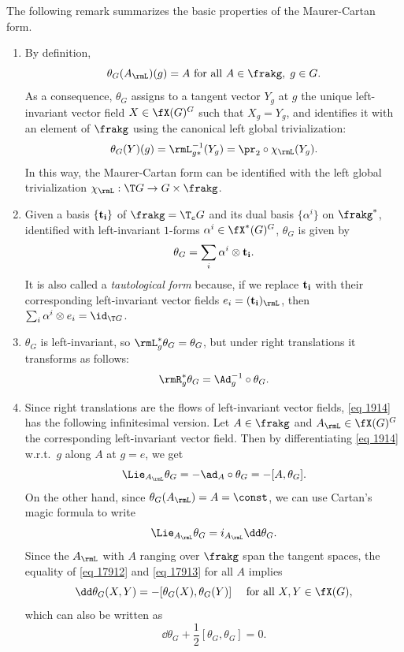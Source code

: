 The following remark summarizes the basic properties of the Maurer-Cartan form.

\begin{rem}
    \begin{enumerate}
        \item By definition,
        \[\theta_G(A_\rmL)(g)=A\text{ for all }A\in\frakg,\; g\in G.\]
        As a consequence, $\theta_G$ assigns to a tangent vector $Y_g$ at $g$ the unique left-invariant vector field $X\in\fX(G)^G$ such that $X_g=Y_g$, and identifies it with an element of $\frakg$ using the canonical left global trivialization:
        \[\theta_G(Y)(g)=\rmL_{g\ast}^{-1}(Y_g)=\pr_2\circ \chi_\rmL(Y_g).\]
        In this way, the Maurer-Cartan form can be identified with the left global trivialization $\chi_\rmL:\T G\to G\times\frakg$.
        \item Given a basis $\{\bf{t}_i\}$ of $\frakg=\T_eG$ and its dual basis $\{\alpha^i\}$ on $\frakg^\ast$, identified with left-invariant $1$-forms $\alpha^i\in\fX^\ast(G)^G$, $\theta_G$ is given by
        \[\theta_G=\sum_i \alpha^i\otimes \bf{t}_i.\]
        It is also called a \emph{tautological form} because, if we replace $\bf{t}_i$ with their corresponding left-invariant vector fields $e_i=(\bf{t}_i)_\rmL$, then $\sum_i \alpha^i\otimes e_i=\id_{\T G}$.
        \item $\theta_G$ is left-invariant, so $\rmL_g^\ast\theta_G=\theta_G$, but under right translations it transforms as follows:
        \[\rmR_g^\ast\theta_G=\Ad_g^{-1}\circ\theta_G.\label{eq 1914}\]
        \item Since right translations are the flows of left-invariant vector fields, \eqref{eq 1914} has the following infinitesimal version. Let $A\in\frakg$ and $A_\rmL\in\fX(G)^G$ the corresponding left-invariant vector field. Then by differentiating \eqref{eq 1914} w.r.t.\ $g$ along $A$ at $g=e$, we get 
        \[\Lie_{A_\rmL}\theta_G=-\ad_A\circ\theta_G=-[A,\theta_G].\label{eq 17912}\]
        On the other hand, since $\theta_G(A_\rmL)=A=\const$, we can use Cartan's magic formula to write
        \[\Lie_{A_\rmL}\theta_G=i_{A_\rmL}\dd\theta_G.\label{eq 17913}\]
        Since the $A_\rmL$ with $A$ ranging over $\frakg$ span the tangent spaces, the equality of \eqref{eq 17912} and \eqref{eq 17913} for all $A$ implies
        \[\dd\theta_G(X,Y)=-[\theta_G(X),\theta_G(Y)]\quad \text{ for all } X,Y\in\fX(G),\]
        which can also be written as
        \[\boxed{\dd\theta_G +\frac12 [\theta_G,\theta_G]=0.}\label{eq 5.5.10 RS1 maurer-cartan}\]

\end{enumerate}
\end{rem}
